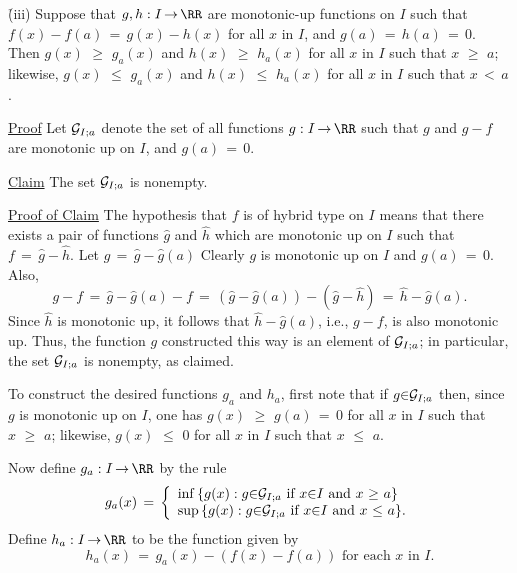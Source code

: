 \V

        \h (iii) Suppose that $g,h:I \,{\rightarrow}\, {\RR}$ are monotonic-up functions on $I$ such that $f(x) - f(a) \,=\, g(x)-h(x)$ for all $x$ in $I$,
    and $g(a) \,=\, h(a) \,=\, 0$.
    Then $g(x)\,\,{\geq}\,\,g_{a}(x)$ and $h(x)\,\,{\geq}\,\,h_{a}(x)$ for all $x$ in $I$ such that $x\,\,{\geq}\,\,a$;
    likewise, $g(x)\,\,{\leq}\,\,g_{a}(x)$ and $h(x)\,\,{\leq}\,\,h_{a}(x)$ for all $x$ in $I$ such that $x\,<\,a$.

\V

        \underline{Proof} Let ${\cal G}_{I;a}$ denote the set of all functions $g:I \,{\rightarrow}\, {\RR}$ such that $g$ and $g-f$ are monotonic up on $I$, and $g(a) \,=\, 0$.

        \underline{Claim} The set ${\cal G}_{I;a}$ is nonempty.

        \underline{Proof of Claim} The hypothesis that $f$ is of hybrid type on $I$ means that there exists a pair of functions $\hat{g}$ and $\hat{h}$ which are monotonic up on $I$ such that $f \,=\, \hat{g}-\hat{h}$.
    Let $g \,=\, \hat{g}-\hat{g}(a)$
    Clearly $g$ is monotonic up on $I$ and $g(a) \,=\, 0$.
    Also,
        \begin{displaymath}
        g-f \,=\, \hat{g}-\hat{g}(a)-f \,=\, \left(\hat{g}-\hat{g}(a)\right)-\left(\hat{g}-\hat{h}\right) \,=\, \hat{h}-\hat{g}(a).
        \end{displaymath}
    Since $\hat{h}$ is monotonic up, it follows that $\hat{h}-\hat{g}(a)$, i.e., $g-f$, is also monotonic up.
    Thus, the function $g$ constructed this way is an element of ${\cal G}_{I;a}$; in particular, the set ${\cal G}_{I;a}$ is nonempty, as claimed.


        To construct the desired functions $g_{a}$ and $h_{a}$, first note that if $g{\in}{\cal G}_{I;a}$ then, since $g$ is monotonic up on $I$,
    one has $g(x)\,\,{\geq}\,\,g(a) \,=\, 0$ for all $x$ in $I$ such that $x\,\,{\geq}\,\,a$;
    likewise, $g(x)\,\,{\leq}\,\,0$ for all $x$ in $I$ such that $x\,\,{\leq}\,\,a$.


        Now define $g_{a}:I \,{\rightarrow}\, {\RR}$ by the rule
        \begin{equation}
        \label{EqnF.75}
        g_{a}(x) \,=\, \left\{
        \begin{array}{ll}
        {\inf}\,\{g(x): g{\in}{\cal G}_{I;a} \mbox{ if $x{\in}I$ and  $x\,\,{\geq}\,\,a$\}} \\
        {\sup}\,\{g(x): g{\in}{\cal G}_{I;a} \mbox{ if $x{\in}I$ and  $x\,\,{\leq}\,\,a$\}}.
        \end{array}
        \right.
        \end{equation}
    Define $h_{a}:I \,{\rightarrow}\, {\RR}$ to be the function given by
        \begin{displaymath}
        h_{a}(x) \,=\, g_{a}(x)-(f(x)-f(a)) \mbox{ for each $x$ in $I$}.
        \end{displaymath}

